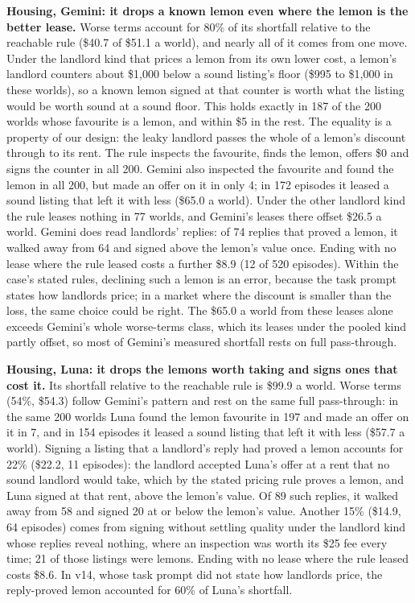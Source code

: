 \textbf{Housing, Gemini: it drops a known lemon even where the lemon is the better lease.} Worse terms account for 80\% of
its shortfall relative to the reachable rule (\$40.7 of \$51.1 a world), and nearly all of it comes from one move. Under
the landlord kind that prices a lemon from its own lower cost, a lemon's landlord counters about \$1,000 below a sound
listing's floor (\$995 to \$1,000 in these worlds), so a known lemon signed at that counter is worth what the listing
would be worth sound at a sound floor. This holds exactly in 187 of the 200 worlds whose favourite is a lemon, and
within \$5 in the rest. The equality is a property of our design: the leaky landlord passes the whole of a lemon's
discount through to its rent. The rule inspects the favourite, finds the lemon, offers \$0 and signs the counter in all 200.
Gemini also inspected the favourite and found the lemon in all 200, but made an offer on it in only 4; in 172 episodes
it leased a sound listing that left it with less (\$65.0 a world). Under the other landlord kind the rule leases nothing
in 77 worlds, and Gemini's leases there offset \$26.5 a world. Gemini does read landlords' replies: of 74 replies that
proved a lemon, it walked away from 64 and signed above the lemon's value once. Ending with no lease where the rule
leased costs a further \$8.9 (12 of 520 episodes). Within the case's stated rules, declining such a lemon is an error, because
the task prompt states how landlords price; in a market where the discount is smaller than the loss, the same choice
could be right. The \$65.0 a world from these leases alone exceeds Gemini's whole worse-terms class, which its leases
under the pooled kind partly offset, so most of Gemini's measured shortfall rests on full pass-through.

\textbf{Housing, Luna: it drops the lemons worth taking and signs ones that cost it.} Its shortfall relative to the
reachable rule is \$99.9 a world. Worse terms (54\%, \$54.3) follow Gemini's pattern and rest on the same full pass-through: in the same 200 worlds Luna found
the lemon favourite in 197 and made an offer on it in 7, and in 154 episodes it leased a sound listing that left it
with less (\$57.7 a world). Signing a listing that a landlord's reply had proved a lemon accounts for 22\% (\$22.2,
11 episodes): the landlord accepted Luna's offer at a rent that no sound landlord would take, which by the stated
pricing rule proves a lemon, and Luna signed at that rent, above the lemon's value. Of 89 such replies, it walked away
from 58 and signed 20 at or below the lemon's value. Another 15\% (\$14.9, 64 episodes) comes from signing without
settling quality under the landlord kind whose replies reveal nothing, where an inspection was worth its \$25 fee every
time; 21 of those listings were lemons. Ending with no lease where the rule leased costs \$8.6. In v14, whose task
prompt did not state how landlords price, the reply-proved lemon accounted for 60\% of Luna's shortfall.

